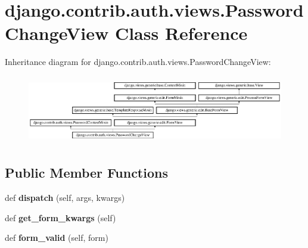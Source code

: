 \hypertarget{classdjango_1_1contrib_1_1auth_1_1views_1_1_password_change_view}{}\section{django.\+contrib.\+auth.\+views.\+Password\+Change\+View Class Reference}
\label{classdjango_1_1contrib_1_1auth_1_1views_1_1_password_change_view}
Inheritance diagram for django.\+contrib.\+auth.\+views.\+Password\+Change\+View\+:\begin{figure}[H]
\begin{center}
\leavevmode
\includegraphics[height=3.001072cm]{classdjango_1_1contrib_1_1auth_1_1views_1_1_password_change_view}
\end{center}
\end{figure}
\subsection*{Public Member Functions}
\begin{DoxyCompactItemize}
\item 
\mbox{\label{classdjango_1_1contrib_1_1auth_1_1views_1_1_password_change_view_ad3ad071b32c45862ba7131d4994f100b}} 
def {\bfseries dispatch} (self, args, kwargs)
\item 
\mbox{\label{classdjango_1_1contrib_1_1auth_1_1views_1_1_password_change_view_a819ee3cbfcf3ce40a8a1aa66bef97850}} 
def {\bfseries get\+\_\+form\+\_\+kwargs} (self)
\item 
\mbox{\label{classdjango_1_1contrib_1_1auth_1_1views_1_1_password_change_view_a809e1f6e2e22fd3199b7236bbb90e2da}} 
def {\bfseries form\+\_\+valid} (self, form)
\end{DoxyCompactItemize}
